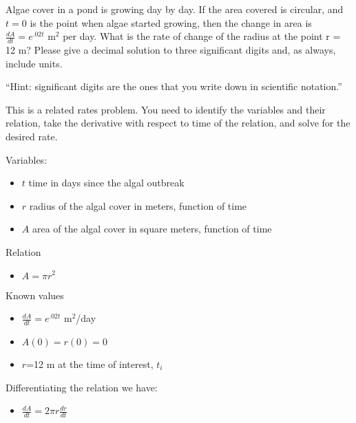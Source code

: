 \documentclass{ximera}
\author{Emma Smith Zbarsky}
\begin{document}
\begin{exercise}

Algae cover in a pond is growing day by day. If the area covered is
circular, and $t=0$ is the point when algae started growing, then the
change in area is $\frac{dA}{dt} = e^{.02t}$ m$^2$ per day. What is the
rate of change of the radius at the point r = 12 m? Please give a
decimal solution to three significant digits and, as always, include
units.

``Hint: significant digits are the ones that you write down in
scientific notation.''


\begin{hint}
This is a related rates problem. You need to identify the variables and
their relation, take the derivative with respect to time of the
relation, and solve for the desired rate.
\end{hint}


\begin{hint}
Variables:

\begin{itemize}
\item
  $t$ time in days since the algal outbreak
\item
  $r$ radius of the algal cover in meters, function of time
\item
  $A$ area of the algal cover in square meters, function of time
\end{itemize}

Relation

\begin{itemize}
\itemsep1pt\parskip0pt
\item
  $A = \pi r^2$
\end{itemize}

Known values

\begin{itemize}
\item
  $\frac{dA}{dt} = e^{.02t}$ m$^2$/day
\item
  $A(0) = r(0) = 0$
\item
  $r$=12 m at the time of interest, $t_i$
\end{itemize}

Differentiating the relation we have:

\begin{itemize}
\itemsep1pt\parskip0pt
\item
  $\frac{dA}{dt} = 2\pi r \frac{dr}{dt}$
\end{itemize}


\end{hint}
\end{exercise}
\end{document}
